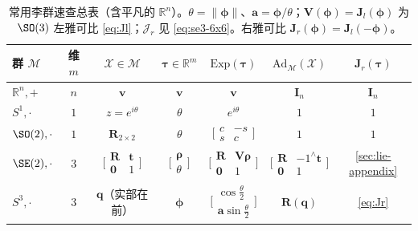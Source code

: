 \begin{table}[H]\centering\footnotesize
\caption{常用李群速查总表（含平凡的 $\mathbb{R}^n$）。$\theta=\|\boldsymbol{\phi}\|$、$\mathbf{a}=\boldsymbol{\phi}/\theta$；$\mathbf{V}(\boldsymbol{\phi})=\mathbf{J}_l(\boldsymbol{\phi})$ 为 $\SO(3)$ 左雅可比 \cref{eq:Jl}；$\boldsymbol{\mathcal{J}}_r$ 见 \cref{eq:se3-6x6}。右雅可比 $\mathbf{J}_r(\boldsymbol{\phi})=\mathbf{J}_l(-\boldsymbol{\phi})$。}
\label{tab:lie-cheatsheet}
\begin{tabular}{lcccccc}
\toprule
群 $\mathcal{M}$ & 维 $m$ & $\mathcal{X}\in\mathcal{M}$ & $\boldsymbol{\tau}\in\mathbb{R}^m$ & $\mathrm{Exp}(\boldsymbol{\tau})$ & $\mathrm{Ad}_{\mathcal{M}}(\mathcal{X})$ & $\mathbf{J}_r(\boldsymbol{\tau})$ \\
\midrule
$\mathbb{R}^n,+$ & $n$ & $\mathbf{v}$ & $\mathbf{v}$ & $\mathbf{v}$ & $\mathbf{I}_n$ & $\mathbf{I}_n$ \\
$S^1,\cdot$ & $1$ & $z=e^{i\theta}$ & $\theta$ & $e^{i\theta}$ & $1$ & $1$ \\
$\SO(2),\cdot$ & $1$ & $\mathbf{R}_{2\times2}$ & $\theta$ & $\big[\begin{smallmatrix}c&-s\\s&c\end{smallmatrix}\big]$ & $1$ & $1$ \\
$\SE(2),\cdot$ & $3$ & $\big[\begin{smallmatrix}\mathbf{R}&\mathbf{t}\\\mathbf{0}&1\end{smallmatrix}\big]$ & $\big[\begin{smallmatrix}\boldsymbol{\rho}\\\theta\end{smallmatrix}\big]$ & $\big[\begin{smallmatrix}\mathbf{R}&\mathbf{V}\boldsymbol{\rho}\\\mathbf{0}&1\end{smallmatrix}\big]$ & $\big[\begin{smallmatrix}\mathbf{R}&-1^\wedge\mathbf{t}\\\mathbf{0}&1\end{smallmatrix}\big]$ & \cref{sec:lie-appendix} \\
$S^3,\cdot$ & $3$ & $\mathbf{q}$（实部在前） & $\boldsymbol{\phi}$ & $\big[\begin{smallmatrix}\cos\frac{\theta}{2}\\\mathbf{a}\sin\frac{\theta}{2}\end{smallmatrix}\big]$ & $\mathbf{R}(\mathbf{q})$ & \cref{eq:Jr} \\

\end{tabular}
\end{table}
